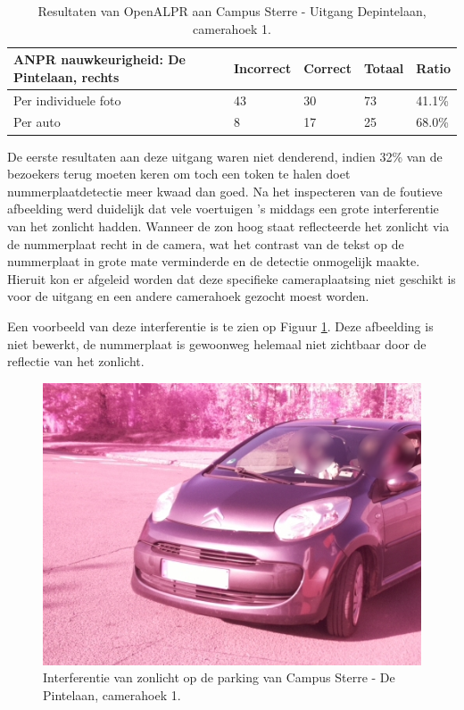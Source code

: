 \begin{table}[h!]
	\centering
	\begin{tabular}{l|l|l|l|l}
		\textbf{ANPR nauwkeurigheid: De Pintelaan, rechts} & Incorrect & Correct & Totaal & Ratio	\\ \hline
		Per individuele foto 	& 43	& 30	& 73 & 41.1\%\\
		Per auto				& 8	& 17 	& 25 & 68.0\%\\
	\end{tabular}
\caption{Resultaten van OpenALPR aan Campus Sterre - Uitgang Depintelaan, camerahoek 1.}
\label{tab:alprdepintelaan1}
\end{table}

De eerste resultaten aan deze uitgang waren niet denderend, indien 32\% van de bezoekers terug moeten keren om toch een token te halen doet nummerplaatdetectie meer kwaad dan goed. Na het inspecteren van de foutieve afbeelding werd duidelijk dat vele voertuigen 's middags een grote interferentie van het zonlicht hadden. Wanneer de zon hoog staat reflecteerde het zonlicht via de nummerplaat recht in de camera, wat het contrast van de tekst op de nummerplaat in grote mate verminderde en de detectie onmogelijk maakte. Hieruit kon er afgeleid worden dat deze specifieke cameraplaatsing niet geschikt is voor de uitgang en een andere camerahoek gezocht moest worden. 

Een voorbeeld van deze interferentie is te zien op Figuur \ref{SterreZonlicht}. Deze afbeelding is niet bewerkt, de nummerplaat is gewoonweg helemaal niet zichtbaar door de reflectie van het zonlicht.
\begin{figure}[h!]
	\centering
	\includegraphics[width=0.8\linewidth]{img/sterre2zon.jpg}
	\caption{Interferentie van zonlicht op de parking van Campus Sterre - De Pintelaan, camerahoek 1.}
	\label{SterreZonlicht}
\end{figure}

